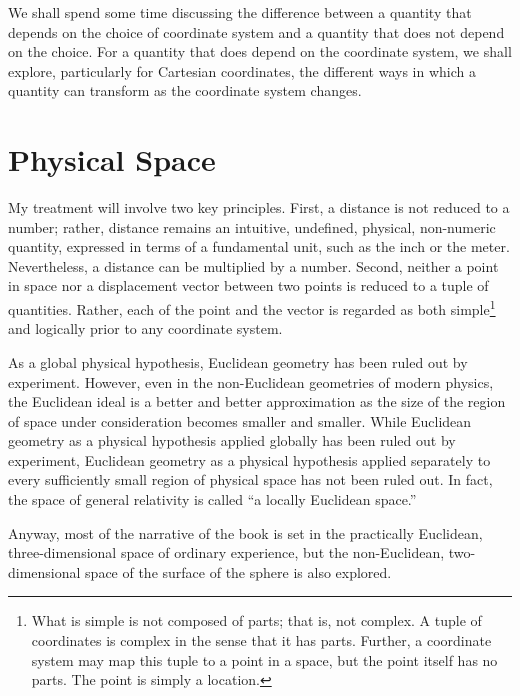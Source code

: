We shall spend some time discussing the difference between a quantity that
depends on the choice of coordinate system and a quantity that does not depend
on the choice.  For a quantity that does depend on the coordinate system, we
shall explore, particularly for Cartesian coordinates, the different ways in
which a quantity can transform as the coordinate system changes.

\section{Physical Space}

My treatment will involve two key principles.  First, a distance is not reduced
to a number; rather, distance remains an intuitive, undefined, physical,
non-numeric quantity, expressed in terms of a fundamental unit, such as the
inch or the meter.  Nevertheless, a distance can be multiplied by a number.
Second, neither a point in space nor a displacement vector between two points
is reduced to a tuple of quantities.  Rather, each of the point and the vector
is regarded as both simple\footnote{%
   What is simple is not composed of parts; that is, not complex.  A tuple of
   coordinates is complex in the sense that it has parts.  Further, a
   coordinate system may map this tuple to a point in a space, but the point
   itself has no parts.  The point is simply a location.%
}
and logically prior to any coordinate system.

As a global physical hypothesis, Euclidean geometry has been ruled out by
experiment.
However, even in the non-Euclidean geometries of modern physics, the Euclidean
ideal is a better and better approximation as the size of the region of space
under consideration becomes smaller and smaller.  While Euclidean geometry as a
physical hypothesis applied globally has been ruled out by experiment,
Euclidean geometry as a physical hypothesis applied separately to every
sufficiently small region of physical space has not been ruled out.  In fact,
the space of general relativity is called ``a locally Euclidean space.''

Anyway, most of the narrative of the book is set in the practically Euclidean,
three-dimensional space of ordinary experience, but the non-Euclidean,
two-dimensional space of the surface of the sphere is also explored.

